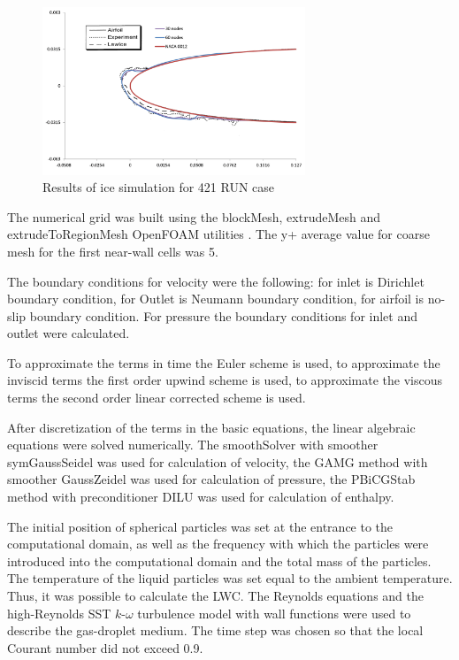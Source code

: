 \documentclass[aerospace,article,submit,moreauthors,pdftex]{Definitions/mdpi}
\begin{document}
\begin{figure}[H]
    \centering
    \includegraphics[width=0.7\textwidth]{Figures/421-30-60.png}
    \caption{Results of ice simulation for 421 RUN case}
    \label{fig:results421}
\end{figure}

The numerical grid was built using the blockMesh, extrudeMesh and extrudeToRegionMesh OpenFOAM utilities \cite{OpenFoam}. The y+ average value for coarse mesh for the first near-wall cells was 5. 

The boundary conditions for velocity were the following: for inlet is Dirichlet boundary condition, for Outlet is Neumann boundary condition, for airfoil is no-slip boundary condition. For pressure the boundary conditions for inlet and outlet were calculated.

To approximate the terms in time the Euler scheme is used, to approximate the inviscid terms the first order upwind scheme is used, to approximate the viscous terms the second order linear corrected scheme is used. 

After discretization of the terms in the basic equations, the linear algebraic equations were solved numerically. The smoothSolver with smoother symGaussSeidel was used for calculation of velocity, the GAMG method with smoother GaussZeidel was used for calculation of pressure, the PBiCGStab method with preconditioner DILU was used for calculation of enthalpy.  

The initial position of spherical particles was set at the entrance to the computational domain, as well as the frequency with which the particles were introduced into the computational domain and the total mass of the particles. The temperature of the liquid particles was set equal to the ambient temperature. Thus, it was possible to calculate the LWC. The Reynolds equations and the high-Reynolds SST $k\text{-}\omega$ turbulence model with wall functions were used to describe the gas-droplet medium. The time step was chosen so that the local Courant number did not exceed 0.9.
\end{document}
